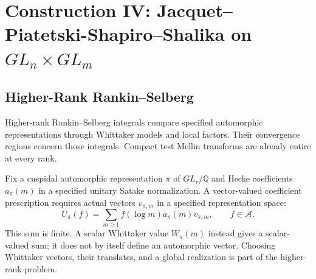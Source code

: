 \section{Construction IV: Jacquet--Piatetski-Shapiro--Shalika on \(GL_{n}\times GL_{m}\)}
\label{v4-arith:w6-b:construction-IV}

\subsection{Higher-Rank Rankin--Selberg}
\label{v4-arith:w6-b:construction-IV:higher-rank}


Higher-rank Rankin--Selberg integrals compare specified automorphic
representations through Whittaker models and local factors.
Their convergence regions concern those integrals. Compact test
Mellin transforms are already entire at every rank.
\begin{definition}
\label{v4-arith:w6-b:def:upsilon-GLn}
Fix a cuspidal automorphic representation $\pi$ of $GL_r/\mathbb Q$
and Hecke coefficients $a_\pi(m)$ in a specified unitary Satake
normalization. A vector-valued coefficient prescription requires
actual vectors $v_{\pi,m}$ in a specified representation space:
\begin{equation}
\label{v4-arith:w6-b:eq:upsilon-GLn}
 U_\pi(f)=\sum_{m\ge1}f(\log m)a_\pi(m)v_{\pi,m},\qquad f\in\mathscr A.
\end{equation}
This sum is finite. A scalar Whittaker value $W_\pi(m)$ instead
gives a scalar-valued sum; it does not by itself define an
automorphic vector. Choosing Whittaker vectors, their translates,
and a global realization is part of the higher-rank problem.
\end{definition}

